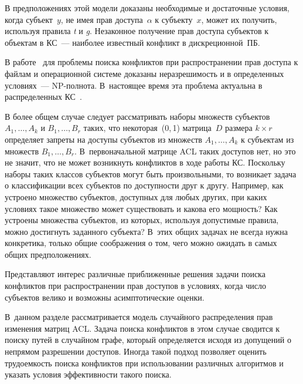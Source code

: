 \begin{multicols}{2}
В предположениях этой модели доказаны необходимые и достаточные
условия, когда субъект~$y$, не имея прав доступа~$\alpha$ к субъекту~$x$, 
может их получить, используя правила \textit{t} и \textit{g}.
Незаконное получение прав доступа субъектов к объектам в КС~---
наиболее известный конфликт в дискреционной~ПБ.

В работе~\cite{b7} для проблемы поиска конфликтов при распространении прав доступа к файлам и 
операционной сис\-те\-ме 
доказаны неразрешимость и в определенных условиях~--- NP-полнота. В~настоящее время эта проблема 
актуальна в распределенных КС~\cite{b4,b12}.

В более общем случае следует рассматривать наборы множеств субъектов
$A_1, \ldots ,A_k$ и $B_1, \ldots ,B_r$ таких, что некоторая~(0,\,1) матрица~$D$ размера $k\times r$ 
определяет запреты на доступы субъектов из
множеств $A_1,\ldots ,A_k$ к субъектам из множеств $B_1,\ldots ,B_r$. 
В~первоначальной матрице ACL таких доступов нет, но это не значит, что
не может возникнуть конфликтов в ходе работы КС. Поскольку наборы
таких классов субъектов могут быть произвольными, то возникает
задача о классификации всех субъектов по доступности друг к другу.
Например, как устроено множество субъектов, доступных для любых
других, при каких условиях такое множество может существовать и
какова его мощность? Как устроены множества субъектов, из которых,
используя допустимые правила, можно достигнуть заданного субъекта? В~этих 
общих задачах не всегда нужна конкретика, только общие
соображения о том, чего можно ожидать в самых общих предположениях.

Представляют интерес различные приближенные решения задачи поиска
конфликтов при распространении прав доступов в условиях, когда чис\-ло
субъектов велико и возможны асимптотические оценки.

В~данном разделе рассматривается модель случайного распределения
прав изменения матриц ACL. Задача поиска конфликтов в этом случае
сводится к поиску путей в случайном графе, который определяется
исходя из допущений о непрямом разрешении доступов. Иногда такой
подход позволяет оценить трудоемкость поиска конфликтов при
использовании различных алгоритмов и указать условия эффективности
такого поиска.


\end{multicols}
